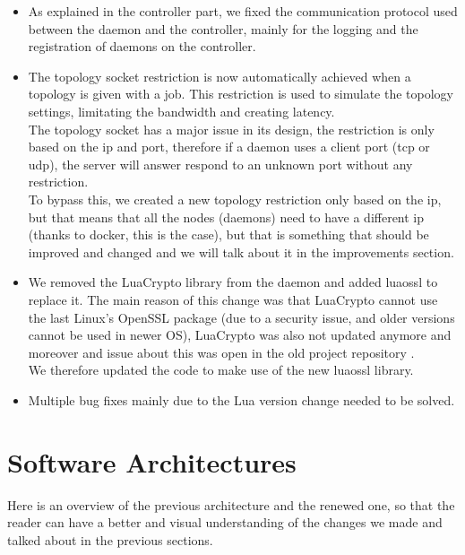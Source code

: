 \documentclass{eplmastersthesis}
\begin{document}
        \begin{itemize}
          \item As explained in the controller part, we fixed the communication
          protocol used between the daemon and the controller, mainly for
          the logging and the registration of daemons on the controller.
          \item The topology socket restriction is now automatically achieved
          when a topology is given with a job. This restriction is used to
          simulate the topology settings, limitating the bandwidth and creating
          latency.\\
          The topology socket has a major issue in its design, the restriction
          is only based on the ip and port, therefore if a daemon uses a client
          port (tcp or udp), the server will answer respond to an unknown port
          without any restriction.\\
          To bypass this, we created a new topology restriction only based on
          the ip, but that means that all the nodes (daemons) need to have a
          different ip (thanks to docker, this is the case), but that is
          something that should be improved and changed and we will talk about
          it in the improvements section.
          \item We removed the LuaCrypto library from the daemon and added
          luaossl to replace it. The main reason of this change was that
          LuaCrypto cannot use the last Linux's OpenSSL package (due to a
          security issue, and older versions cannot be used in newer OS),
          LuaCrypto was also not updated anymore and moreover and issue about
          this was open in the old project repository \cite{sslLib}.\\
          We therefore updated the code to make use of the new luaossl library.
          \item Multiple bug fixes mainly due to the Lua version change needed
          to be solved.
        \end{itemize}

    \section{Software Architectures}

      Here is an overview of the previous architecture and the renewed one,
      so that the reader can have a better and visual understanding
      of the changes we made and talked about in the previous sections.
\end{document}
